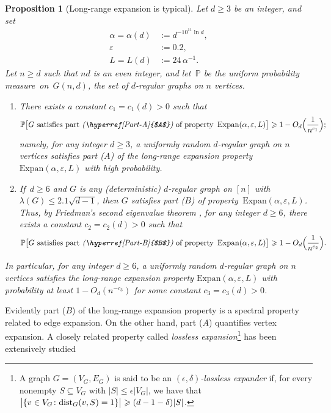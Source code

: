 \documentclass[11pt,leqno]{amsart}
\newtheorem{proposition}[theorem]{Proposition}
\theoremstyle{remark}
\theoremstyle{plain}
\def\dist{{\rm dist}}
\def\dist{{\rm dist}}
\newcommand{\eps}{\epsilon}
\begin{document}
\begin{proposition}[Long-range expansion is typical] \label{lemma:long-range-expansion}
Let $d \geqslant 3$ be an integer, and set
\begin{align}
\alpha=\alpha(d) & := d^{-10^{11} \ln d},\label{era-1} \\
\varepsilon & := 0.2, \label{era-2} \\
L= L(d) & := 24\,\alpha^{-1}. \label{era-3}
\end{align}
Let $n\geqslant d$ such that $nd$ is an even integer, and let\, $\mathbb{P}$ be the uniform probability measure~on~$G(n,d)$,
the set of $d$-regular graphs on $n$ vertices.
\begin{enumerate}
\item[(a)] There exists a constant $c_1=c_1(d)>0$ such that
\[ \mathbb{P}\big[G \text{ satisfies part \emph{(\hyperref[Part-A]{$A$})} of property\, $\mathrm{Expan}(\alpha,\varepsilon,L)$}\big]
\geqslant 1-O_{d}\Big(\frac{1}{n^{c_1}}\Big);  \]
namely, for any integer $d\geqslant 3$, a uniformly random $d$-regular graph on $n$ vertices satisfies
part \emph{(\hyperref[Part-A]{$A$})} of the long-range expansion property\, $\mathrm{Expan}(\alpha,\varepsilon,L)$
with high probability.
\item[(b)] If\, $d\geqslant 6$ and $G$ is any (deterministic) $d$-regular graph on $[n]$ with
$\lambda(G) \leqslant 2.1\sqrt{d-1}$, then $G$ satisfies part \emph{(\hyperref[Part-B]{$B$})}
of property\, $\mathrm{Expan}(\alpha,\varepsilon,L)$. Thus, by Friedman's
second eigenvalue theorem \emph{\cite{Fr08}}, for any integer $d\geqslant 6$, there exists a constant $c_2=c_2(d)>0$ such that
\[ \mathbb{P}\big[G \text{ satisfies part \emph{(\hyperref[Part-B]{$B$})} of property\, $\mathrm{Expan}(\alpha,\varepsilon,L)$}\big]
\geqslant 1-O_{d}\Big(\frac{1}{n^{c_2}}\Big).  \]
\end{enumerate}
In particular, for any integer $d\geqslant 6$, a uniformly random $d$-regular graph on $n$ vertices
satisfies the long-range expansion property  $\mathrm{Expan}(\alpha,\varepsilon,L)$
with probability at least $1-O_d\left(n^{-c_3}\right)$
for some constant $c_3=c_3(d)>0$.
\end{proposition}
Evidently part (\hyperref[Part-B]{$B$}) of the long-range expansion property is a spectral property related to edge expansion.
On the other hand, part (\hyperref[Part-A]{$A$}) quantifies vertex expansion. A closely related property called
\emph{lossless expansion}\footnote{A graph $G=(V_G,E_G)$ is said to be an \emph{$(\eps,\delta)$-lossless expander}
if, for every nonempty $S \subseteq V_G$ with $|S| \leqslant \eps |V_G|$, we have that
$\big| \{v\in V_G \colon \dist_G(v,S)= 1\}\big| \geqslant (d-1-\delta)|S|$.} has been extensively studied
\end{document}
